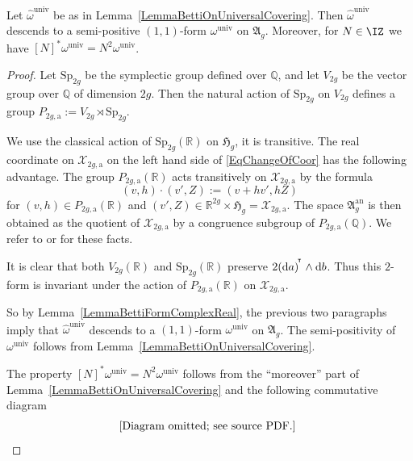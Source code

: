 \begin{lemma}
\notready\label{LemmaBettiFormUnivAb}
Let $\hat{\omega}^{\mathrm{univ}}$ be as in
Lemma~\ref{LemmaBettiOnUniversalCovering}. Then
$\hat{\omega}^{\mathrm{univ}}$ descends to a  semi-positive
$(1,1)$-form $\omega^{\mathrm{univ}}$ on $\mathfrak{A}_g$. Moreover,
for $N\in\IZ$  we have $[N]^*\omega^{\mathrm{univ}} = N^2 \omega^{\mathrm{univ}}$.
\end{lemma}
\begin{proof}
Let $\mathrm{Sp}_{2g}$ be the symplectic group defined over $\mathbb Q$, and let $V_{2g}$ be the vector group over $\mathbb Q$ of dimension $2g$. Then the natural action of $\mathrm{Sp}_{2g}$ on $V_{2g}$ defines a group $P_{2g,\mathrm{a}}:= V_{2g} \rtimes \mathrm{Sp}_{2g}$.

We use the classical action of $\mathrm{Sp}_{2g}(\mathbb R)$  on
$\mathfrak{H}_g$, it is transitive. The real coordinate on $\mathcal X_{2g,\mathrm{a}}$ on the left hand side of \eqref{EqChangeOfCoor} has the following advantage. The group $P_{2g,\mathrm{a}}(\mathbb R)$ acts transitively on $\mathcal X_{2g,\mathrm{a}}$ by the formula
\[
(v,h) \cdot (v',Z) := (v+hv',hZ)
\]
for $(v,h) \in P_{2g,\mathrm{a}}(\mathbb R)$ and $(v',Z) \in \mathbb R^{2g} \times \mathfrak{H}_g = \mathcal X_{2g,\mathrm{a}}$. The space $\mathfrak{A}_g^{\mathrm{an}}$ is then obtained as the quotient of $\mathcal X_{2g,\mathrm{a}}$ by a congruence subgroup of $P_{2g,\mathrm{a}}(\mathbb Q)$. We refer to \cite[10.5--10.9]{PinkThesis} or \cite[Construction~2.9 and Example~2.12]{Pink05} for these facts.


It is clear that both $V_{2g}(\mathbb R)$ and
$\mathrm{Sp}_{2g}(\mathbb R)$ preserve $2{{(\mathrm{d} a)}}^{\!^{\intercal}} \wedge \mathrm{d} b$. Thus this $2$-form is invariant under the action of $P_{2g,\mathrm{a}}(\mathbb R)$ on $\mathcal X_{2g,\mathrm{a}}$.

So by Lemma~\ref{LemmaBettiFormComplexReal}, the previous two paragraphs imply that $\hat{\omega}^{\mathrm{univ}}$ descends to a $(1,1)$-form $\omega^{\mathrm{univ}}$ on $\mathfrak{A}_g$. The semi-positivity of $\omega^{\mathrm{univ}}$ follows from Lemma~\ref{LemmaBettiOnUniversalCovering}.

The property $[N]^*\omega^{\mathrm{univ}} = N^2 \omega^{\mathrm{univ}}$ follows from the ``moreover'' part of Lemma~\ref{LemmaBettiOnUniversalCovering} and the following commutative diagram
\[
\begin{gathered}[b]
\text{[Diagram omitted; see source PDF.]}\
\end{gathered}
\qedhere
\]
\end{proof}


